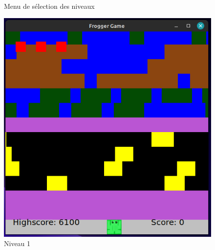 \documentclass[a4paper, 12pt]{article}
\begin{document}
\begin{figure}[h]
\begin{minipage}{0.3\textwidth}
      \caption{Menu de sélection des niveaux}
    \end{minipage}
    \hfill
    \begin{minipage}{0.3\textwidth}
      \centering
      \includegraphics[width=\linewidth]{Images/gamescreenshot.png}
      \caption{Niveau 1}
    \end{minipage}
\end{figure}
\end{document}
